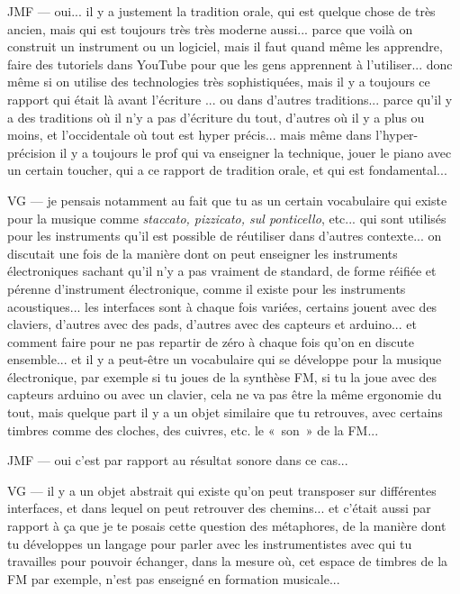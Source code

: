 JMF — oui... il y a justement la tradition orale, qui est quelque chose de très ancien, mais qui est toujours très très moderne aussi... parce que voilà on construit un instrument ou un logiciel, mais il faut quand même les apprendre, faire des tutoriels dans YouTube pour que les gens apprennent à l'utiliser... donc même si on utilise des technologies très sophistiquées, mais il y a toujours ce rapport qui était là avant l'écriture ... ou dans d'autres traditions... parce qu'il y a des traditions où il n'y a pas d'écriture du tout, d'autres où il y a plus ou moins, et l'occidentale où tout est hyper précis... mais même dans l'hyper-précision il y a toujours le prof qui va enseigner la technique, jouer le piano avec un certain toucher, qui a ce rapport de tradition orale, et qui est fondamental... 

VG — je pensais notamment au fait que tu as un certain vocabulaire qui existe pour la musique comme \textit{staccato, pizzicato, sul ponticello}, etc... qui sont utilisés pour les instruments qu'il est possible de réutiliser dans d'autres contexte... on discutait une fois de la manière dont on peut enseigner les instruments électroniques sachant qu'il n'y a pas vraiment de standard, de forme réifiée et pérenne d'instrument électronique, comme il existe pour les instruments acoustiques... les interfaces sont à chaque fois variées, certains jouent avec des claviers, d'autres avec des pads, d'autres avec des capteurs et arduino... et comment faire pour ne pas repartir de zéro à chaque fois qu'on en discute ensemble... et il y a peut-être un vocabulaire qui se développe pour la musique électronique, par exemple si tu joues de la synthèse FM, si tu la joue avec des capteurs arduino ou avec un clavier, cela ne va pas être la même ergonomie du tout, mais quelque part il y a un objet similaire que tu retrouves, avec certains timbres comme des cloches, des cuivres, etc. le « son » de la FM...  

JMF — oui c'est par rapport au résultat sonore dans ce cas... 

VG — il y a un objet abstrait qui existe qu'on peut transposer sur différentes interfaces, et dans lequel on peut retrouver des chemins... et c'était aussi par rapport à ça que je te posais cette question des métaphores, de la manière dont tu développes un langage pour parler avec les instrumentistes avec qui tu travailles pour pouvoir échanger, dans la mesure où, cet espace de timbres de la FM par exemple, n'est pas enseigné en formation musicale... 

